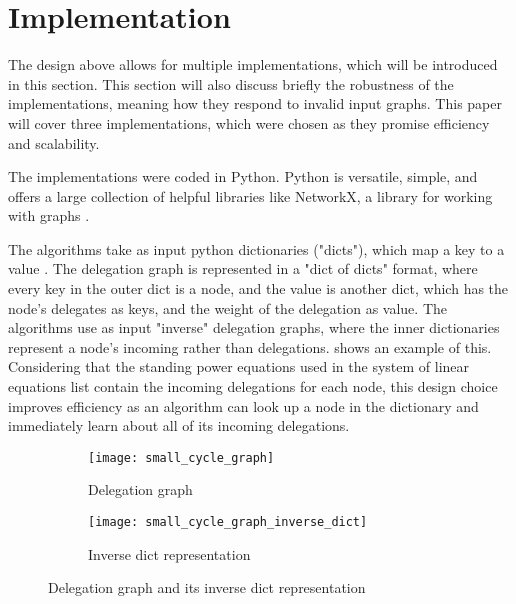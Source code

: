 \graphicspath{{./figures/}}

\chapter{Implementation}
\label{chap:implementation}

The design above allows for multiple implementations, which will be introduced in this section. This section will also discuss briefly the robustness of the implementations, meaning how they respond to invalid input graphs. This paper will cover three implementations, which were chosen as they promise efficiency and scalability.

The implementations were coded in Python. Python is versatile, simple, and offers a large collection of helpful libraries like NetworkX, a library for working with graphs \cite{hagbergExploringNetworkStructure2008}. 

The algorithms take as input python dictionaries ("dicts"), which map a key to a value \cite{pythonsoftwarefoundationPythonTutorialSection}. The delegation graph is represented in a "dict of dicts" format, where every key in the outer dict is a node, and the value is another dict, which has the node's delegates as keys, and the weight of the delegation as value. The algorithms use as input "inverse" delegation graphs, where the inner dictionaries represent a node's incoming rather than delegations.  shows an example of this. Considering that the standing power equations used in the system of linear equations list contain the incoming delegations for each node, this design choice improves efficiency as an algorithm can look up a node in the dictionary and immediately learn about all of its incoming delegations.

\begin{figure}[t]
    \centering
    \begin{subfigure}[t]{0.45\textwidth}
        \centering
        \texttt{[image: small\_cycle\_graph]}
        \caption{Delegation graph}
    \end{subfigure}
    \hfill
    \begin{subfigure}[t]{0.45\textwidth}
        \centering
        \texttt{[image: small\_cycle\_graph\_inverse\_dict]}
        \caption{Inverse dict representation}
    \end{subfigure}
    \caption{Delegation graph and its inverse dict representation}
    \label{fig:inverse_dict_example}
\end{figure}

